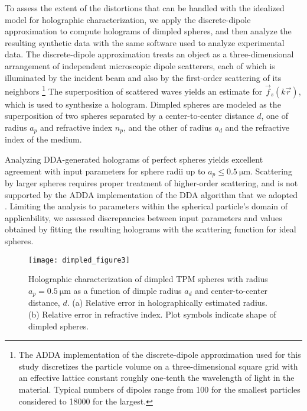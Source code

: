To assess the extent of the distortions that can be handled with the
idealized model for holographic characterization, we apply the
discrete-dipole approximation 
\cite{draine94,yurkin11,fung12,*perry12,*wang14using}
to compute holograms of 
dimpled spheres, and then analyze the resulting synthetic data
with the same software used to analyze experimental data.
The discrete-dipole approximation treats an object as a three-dimensional
arrangement of independent microscopic dipole scatterers, each of which
is illuminated by the incident beam and also by the first-order scattering
of its neighbors
\footnote{The ADDA implementation of the discrete-dipole approximation
\cite{yurkin11} used for this study discretizes the particle volume on a 
three-dimensional square grid with an effective lattice constant
roughly one-tenth the wavelength of light in the material.  Typical
numbers of dipoles range from \num{100} for the smallest particles
considered to \num{18000} for the largest.}
The superposition of scattered waves yields an estimate for 
$\vec{f}_s(k\vec{r})$, which is used to synthesize a hologram.
Dimpled spheres are modeled as the superposition of
two spheres separated by a center-to-center distance $d$, one
of radius $a_p$ and refractive index $n_p$, and the other of radius
$a_d$ and the refractive index of the medium.

Analyzing DDA-generated holograms of perfect spheres yields 
excellent agreement
with input parameters for sphere radii up to $a_p \le \SI{0.5}{\um}$. 
Scattering by larger spheres requires proper treatment of higher-order scattering,
and is not supported by the ADDA implementation of the DDA algorithm
that we adopted \cite{yurkin11,wang14using}.
Limiting the analysis to parameters within the spherical particle's domain of
applicability, we assessed discrepancies between input parameters
and values obtained by fitting
the resulting holograms with the scattering function for ideal spheres.

\begin{figure}[!t]
  \centering
  \texttt{[image: dimpled\_figure3]}
  \caption{Holographic characterization of dimpled TPM spheres 
    with radius $a_p = \SI{0.5}{\um}$ as a function of dimple radius
    $a_d$ and center-to-center distance, $d$.
    (a) Relative error in holographically estimated radius.
    (b) Relative error in refractive index.
    Plot symbols indicate shape of dimpled spheres.}
  \label{fig:dimpledperformance}
\end{figure}

